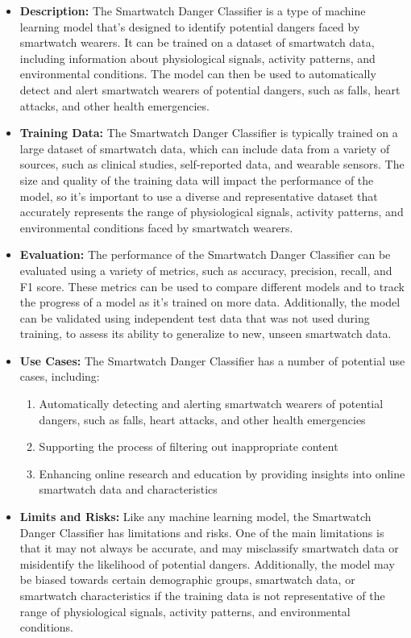 \begin{itemize}
    \item \textbf{Description:} The Smartwatch Danger Classifier is a type of machine learning model that's designed to identify potential dangers faced by smartwatch wearers. It can be trained on a dataset of smartwatch data, including information about physiological signals, activity patterns, and environmental conditions. The model can then be used to automatically detect and alert smartwatch wearers of potential dangers, such as falls, heart attacks, and other health emergencies.
    \item \textbf{Training Data:} The Smartwatch Danger Classifier is typically trained on a large dataset of smartwatch data, which can include data from a variety of sources, such as clinical studies, self-reported data, and wearable sensors. The size and quality of the training data will impact the performance of the model, so it's important to use a diverse and representative dataset that accurately represents the range of physiological signals, activity patterns, and environmental conditions faced by smartwatch wearers.
    \item \textbf{Evaluation:} The performance of the Smartwatch Danger Classifier can be evaluated using a variety of metrics, such as accuracy, precision, recall, and F1 score. These metrics can be used to compare different models and to track the progress of a model as it's trained on more data. Additionally, the model can be validated using independent test data that was not used during training, to assess its ability to generalize to new, unseen smartwatch data.
    \item \textbf{Use Cases:} The Smartwatch Danger Classifier has a number of potential use cases, including:
        \begin{enumerate}  
            \item Automatically detecting and alerting smartwatch wearers of potential dangers, such as falls, heart attacks, and other health emergencies
            \item Supporting the process of filtering out inappropriate content
            \item Enhancing online research and education by providing insights into online smartwatch data and characteristics
        \end{enumerate}
    \item \textbf{Limits and Risks:} Like any machine learning model, the Smartwatch Danger Classifier has limitations and risks. One of the main limitations is that it may not always be accurate, and may misclassify smartwatch data or misidentify the likelihood of potential dangers. Additionally, the model may be biased towards certain demographic groups, smartwatch data, or smartwatch characteristics if the training data is not representative of the range of physiological signals, activity patterns, and environmental conditions.

\end{itemize}
